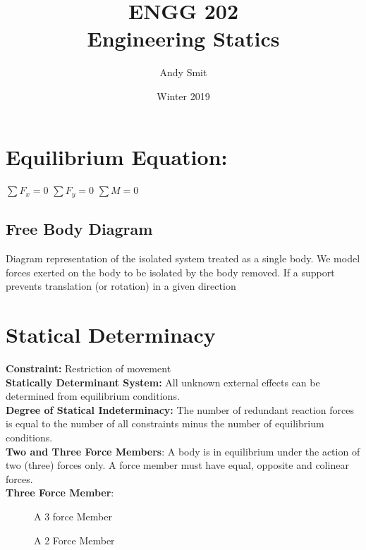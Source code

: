 \documentclass[14pt]{article}
\title{ENGG 202\\Engineering Statics}
\author{Andy Smit}
\date{Winter 2019}
\begin{document}
    \maketitle
    \section{Equilibrium Equation:}
    $\sum F_x=0$ $\sum F_y=0$ $\sum M=0$
    \subsection{Free Body Diagram}
    Diagram representation of the isolated system treated as a single
    body. We model forces exerted on the body to be isolated by the body
    removed. If a support prevents translation (or rotation) in a given
    direction     
    \section{Statical Determinacy}
    \textbf{Constraint: } Restriction of movement\\
    \textbf{Statically Determinant System: }All unknown external effects
    can be determined from equilibrium conditions.\\
    \textbf{Degree of Statical Indeterminacy: }The number of redundant
    reaction forces is equal to the number of all constraints minus the
    number of equilibrium conditions.\\
    \textbf{Two and Three Force Members}: A body is in equilibrium under
    the action of two (three) forces only. A force member must have
    equal, opposite and colinear forces.\\
    \textbf{Three Force Member}:\\
    
    \begin{figure}[h]
        \caption{A 3 force Member}
    \end{figure}
    \begin{figure}[h]
        \caption{A 2 Force Member}

    \end{figure}
\end{document}
